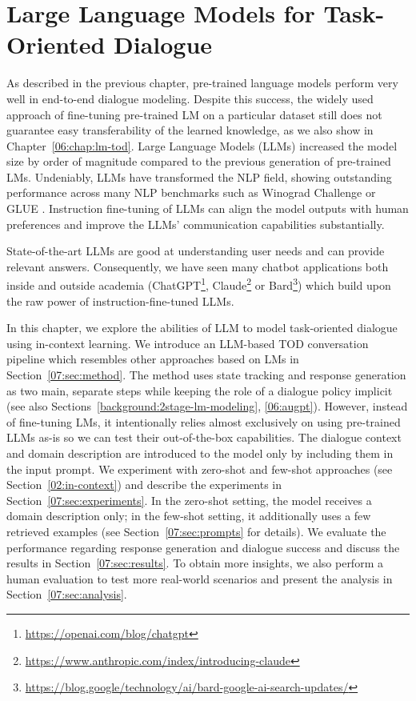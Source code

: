 \chapter{Large Language Models for Task-Oriented Dialogue}
\label{chap:llms}

\label{07:sec:intro}
As described in the previous chapter, pre-trained language models perform very well in end-to-end dialogue modeling.
Despite this success, the widely used approach of fine-tuning pre-trained LM on a particular dataset still does not guarantee easy transferability of the learned knowledge, as we also show in Chapter~\ref{06:chap:lm-tod}.
Large Language Models (LLMs) increased the model size by order of magnitude compared to the previous generation of pre-trained LMs.
Undeniably, LLMs have transformed the NLP field,
showing outstanding performance across many NLP benchmarks such as Winograd Challenge \cite{levesque2012winograd} or GLUE \cite{wang2018glue}.
Instruction fine-tuning of LLMs can align the model outputs with human preferences \cite{ouyang2022training,supernaturalinstructions} and improve the LLMs' communication capabilities substantially.

State-of-the-art LLMs are good at understanding user needs and can provide relevant answers.
Consequently, we have seen many chatbot applications both inside and outside academia (ChatGPT\footnote{\url{https://openai.com/blog/chatgpt}}, Claude\footnote{\url{https://www.anthropic.com/index/introducing-claude}} or Bard\footnote{\url{https://blog.google/technology/ai/bard-google-ai-search-updates/}}) which build upon the raw power of instruction-fine-tuned LLMs.

In this chapter, we explore the abilities of LLM to model task-oriented dialogue using in-context learning.
We introduce an LLM-based TOD conversation pipeline which resembles other approaches based on LMs \cite{peng-etal-2021-soloist,yang2021ubar} in Section~\ref{07:sec:method}.
The method uses state tracking and response generation as two main, separate steps while keeping the role of a dialogue policy implicit (see also Sections~\ref{background:2stage-lm-modeling}, \ref{06:augpt}).
However, instead of fine-tuning LMs, it intentionally relies almost exclusively on using pre-trained LLMs as-is so we can test their out-of-the-box capabilities.
The dialogue context and domain description are introduced to the model only by including them in the input prompt.
We experiment with zero-shot and few-shot approaches (see Section~\ref{02:in-context}) and describe the experiments in Section~\ref{07:sec:experiments}.
In the zero-shot setting, the model receives a domain description only; in the few-shot setting, it additionally uses a few retrieved examples (see Section~\ref{07:sec:prompts} for details).
We evaluate the performance regarding response generation and dialogue success and discuss the results in Section~\ref{07:sec:results}.
To obtain more insights, we also perform a human evaluation to test more real-world scenarios and present the analysis in Section~\ref{07:sec:analysis}.

